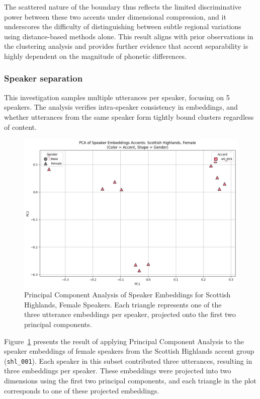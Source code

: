 \documentclass[conference]{IEEEtran}
\begin{document}
	The scattered nature of the boundary thus reflects the limited discriminative power between these two accents under dimensional compression, and it underscores the difficulty of distinguishing between subtle regional variations using distance-based methods alone. This result aligns with prior observations in the clustering analysis and provides further evidence that accent separability is highly dependent on the magnitude of phonetic differences.
	
	
	
	
	
	
	\bigskip
	
	
	
	\subsubsection{Speaker separation}
	This investigation samples multiple utterances per speaker, focusing on 5 speakers. The analysis verifies intra-speaker consistency in embeddings, and whether utterances from the same speaker form tightly bound clusters regardless of content.
	
	
	
	\begin{figure}[h]
		\centering
		\includegraphics[width=0.85\linewidth]{img/img-cluster-speaker-separation.png}
		\caption{Principal Component Analysis of Speaker Embeddings for Scottish Highlands, Female Speakers. Each triangle represents one of the three utterance embeddings per speaker, projected onto the first two principal components.}
		\label{fig:pca-shl-female}
	\end{figure}
	
	
	Figure~\ref{fig:pca-shl-female} presents the result of applying Principal Component Analysis to the speaker embeddings of female speakers from the Scottish Highlands accent group (\texttt{shl\_001}). Each speaker in this subset contributed three utterances, resulting in three embeddings per speaker. These embeddings were projected into two dimensions using the first two principal components, and each triangle in the plot corresponds to one of these projected embeddings.
	
\end{document}
